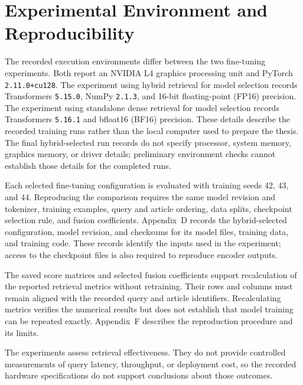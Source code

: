 \section{Experimental Environment and Reproducibility}
\label{sec:experimental-environment}

The recorded execution environments differ between the two fine-tuning experiments. Both report an NVIDIA L4 graphics processing unit and PyTorch \texttt{2.11.0+cu128}. The experiment using hybrid retrieval for model selection records Transformers \texttt{5.15.0}, NumPy \texttt{2.1.3}, and 16-bit floating-point (FP16) precision. The experiment using standalone dense retrieval for model selection records Transformers \texttt{5.16.1} and bfloat16 (BF16) precision. These details describe the recorded training runs rather than the local computer used to prepare the thesis. The final hybrid-selected run records do not specify processor, system memory, graphics memory, or driver details; preliminary environment checks cannot establish those details for the completed runs.

Each selected fine-tuning configuration is evaluated with training seeds 42, 43, and 44. Reproducing the comparison requires the same model revision and tokenizer, training examples, query and article ordering, data splits, checkpoint selection rule, and fusion coefficients. Appendix~D records the hybrid-selected configuration, model revision, and checksums for its model files, training data, and training code. These records identify the inputs used in the experiment; access to the checkpoint files is also required to reproduce encoder outputs.

The saved score matrices and selected fusion coefficients support recalculation of the reported retrieval metrics without retraining. Their rows and columns must remain aligned with the recorded query and article identifiers. Recalculating metrics verifies the numerical results but does not establish that model training can be repeated exactly. Appendix~F describes the reproduction procedure and its limits.

The experiments assess retrieval effectiveness. They do not provide controlled measurements of query latency, throughput, or deployment cost, so the recorded hardware specifications do not support conclusions about those outcomes.
